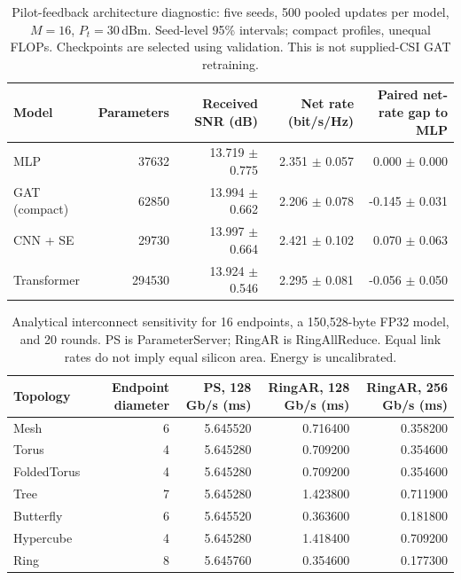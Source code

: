 \begin{table}[t]\centering\small
\caption{Pilot-feedback architecture diagnostic: five seeds, 500 pooled updates per model, $M=16$, $P_t=30$\,dBm. Seed-level 95\% intervals; compact profiles, unequal FLOPs. Checkpoints are selected using validation. This is not supplied-CSI GAT retraining.}
\label{tab:pilot-architecture}\begin{tabular}{lrrrr}\toprule
Model & Parameters & Received SNR (dB) & Net rate (bit/s/Hz) & Paired net-rate gap to MLP\\\midrule
MLP & 37632 & 13.719 $\pm$ 0.775 & 2.351 $\pm$ 0.057 & 0.000 $\pm$ 0.000 \\
GAT (compact) & 62850 & 13.994 $\pm$ 0.662 & 2.206 $\pm$ 0.078 & -0.145 $\pm$ 0.031 \\
CNN + SE & 29730 & 13.997 $\pm$ 0.664 & 2.421 $\pm$ 0.102 & 0.070 $\pm$ 0.063 \\
Transformer & 294530 & 13.924 $\pm$ 0.546 & 2.295 $\pm$ 0.081 & -0.056 $\pm$ 0.050 \\
\bottomrule\end{tabular}\end{table}
\begin{table}[t]\centering\small
\caption{Analytical interconnect sensitivity for 16 endpoints, a 150,528-byte FP32 model, and 20 rounds. PS is ParameterServer; RingAR is RingAllReduce. Equal link rates do not imply equal silicon area. Energy is uncalibrated.}
\label{tab:noc}\begin{tabular}{lrrrr}\toprule
Topology & Endpoint diameter & PS, 128 Gb/s (ms) & RingAR, 128 Gb/s (ms) & RingAR, 256 Gb/s (ms)\\\midrule
Mesh & 6 & 5.645520 & 0.716400 & 0.358200\\
Torus & 4 & 5.645280 & 0.709200 & 0.354600\\
FoldedTorus & 4 & 5.645280 & 0.709200 & 0.354600\\
Tree & 7 & 5.645280 & 1.423800 & 0.711900\\
Butterfly & 6 & 5.645520 & 0.363600 & 0.181800\\
Hypercube & 4 & 5.645280 & 1.418400 & 0.709200\\
Ring & 8 & 5.645760 & 0.354600 & 0.177300\\
\bottomrule\end{tabular}\end{table}
